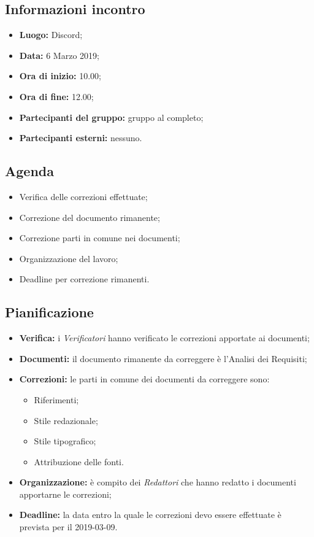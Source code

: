 \subsection{Informazioni incontro}
\begin{itemize}
	\item { \textbf{Luogo:} Discord};
	\item { \textbf{Data:} 6 Marzo 2019};
	\item { \textbf{Ora di inizio:} 10.00};
	\item { \textbf{Ora di fine:} 12.00};
	\item { \textbf{Partecipanti del gruppo:} gruppo al completo};
	\item { \textbf{Partecipanti esterni:} nessuno}.
\end{itemize}


\subsection{Agenda}
\begin{itemize}
	\item {Verifica delle correzioni effettuate;}
	\item {Correzione del documento rimanente;}
	\item {Correzione parti in comune nei documenti;}
	\item {Organizzazione del lavoro;}
	\item {Deadline per correzione rimanenti.}
\end{itemize}

\subsection{Pianificazione}
\begin{itemize}
	\item { \textbf{Verifica:} i \emph{Verificatori} hanno verificato le correzioni apportate ai documenti;}
	\item{ \textbf{Documenti:} il documento rimanente da correggere è l'Analisi dei Requisiti;}
	\item { \textbf{Correzioni:} le parti in comune dei documenti da correggere sono: 
		\begin{itemize}
			\item Riferimenti;
			\item Stile redazionale;
			\item Stile tipografico;
			\item Attribuzione delle fonti.
		\end{itemize}
	}	
	\item { \textbf{Organizzazione:} è compito dei \emph{Redattori} che hanno redatto i documenti apportarne le correzioni;}	
	\item { \textbf{Deadline:} la data entro la quale le correzioni devo essere effettuate è prevista per il 2019-03-09.}
\end{itemize}

